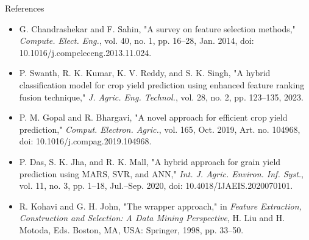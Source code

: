 \documentclass{beamer}
\begin{document}
\begin{frame}{References}
    \begin{footnotesize}
        \begin{itemize}
            \item[{[1]}] G. Chandrashekar and F. Sahin, "A survey on feature selection methods," \textit{Compute. Elect. Eng.}, vol. 40, no. 1, pp. 16–28, Jan. 2014, doi: 10.1016/j.compeleceng.2013.11.024.
            \item[{[2]}] P. Swanth, R. K. Kumar, K. V. Reddy, and S. K. Singh, "A hybrid classification model for crop yield prediction using enhanced feature ranking fusion technique," \textit{J. Agric. Eng. Technol.}, vol. 28, no. 2, pp. 123–135, 2023.
            \item[{[3]}] P. M. Gopal and R. Bhargavi, "A novel approach for efficient crop yield prediction," \textit{Comput. Electron. Agric.}, vol. 165, Oct. 2019, Art. no. 104968, doi: 10.1016/j.compag.2019.104968.
            \item[{[4]}] P. Das, S. K. Jha, and R. K. Mall, "A hybrid approach for grain yield prediction using MARS, SVR, and ANN," \textit{Int. J. Agric. Environ. Inf. Syst.}, vol. 11, no. 3, pp. 1–18, Jul.–Sep. 2020, doi: 10.4018/IJAEIS.2020070101.
            \item[{[5]}] R. Kohavi and G. H. John, "The wrapper approach," in \textit{Feature Extraction, Construction and Selection: A Data Mining Perspective}, H. Liu and H. Motoda, Eds. Boston, MA, USA: Springer, 1998, pp. 33–50.
        \end{itemize}
    \end{footnotesize}
\end{frame}
\end{document}
